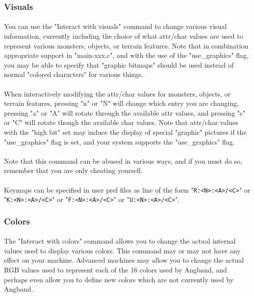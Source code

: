\subsubsection{Visuals}
\paragraph{}You can use the "Interact with visuals" command to change
various visual information, currently including the choice of what
attr/char values are used to represent various monsters, objects, or
terrain features. Note that in combination appropriate support in
"main-xxx.c", and with the use of the "use\_graphics" flag, you may be
able to specify that "graphic bitmaps" should be used instead of normal
"colored characters" for various things.

\paragraph{}When interactively modifying the attr/char values for
monsters, objects, or terrain features, pressing "n" or "N" will change
which entry you are changing, pressing "a" or "A" will rotate through
the available attr values, and pressing "c" or "C" will rotate though
the available char values. Note that attr/char values with the "high
bit" set may induce the display of special "graphic" pictures if the
"use\_graphics" flag is set, and your system supports the
"use\_graphics" flag.

\paragraph{}Note that this command can be abused in various ways, and if
you must do so, remember that you are only cheating yourself.

\paragraph{}Keymaps can be specified in user pref files as line of the
form "\verb+R:<N>:<A>/<C>+" or "\verb+K:<N>:<A>/<C>+" or
"\verb+F:<N>:<A>/<C>+" or "\verb+U:<N>:<A>/<C>+".

\subsubsection{Colors}
\paragraph{}The "Interact with colors" command allows you to change the
actual internal values used to display various colors. This command may
or may not have any effect on your machine. Advanced machines may allow
you to change the actual RGB values used to represent each of the 16
colors used by Angband, and perhaps even allow you to define new colors
which are not currently used by Angband.


